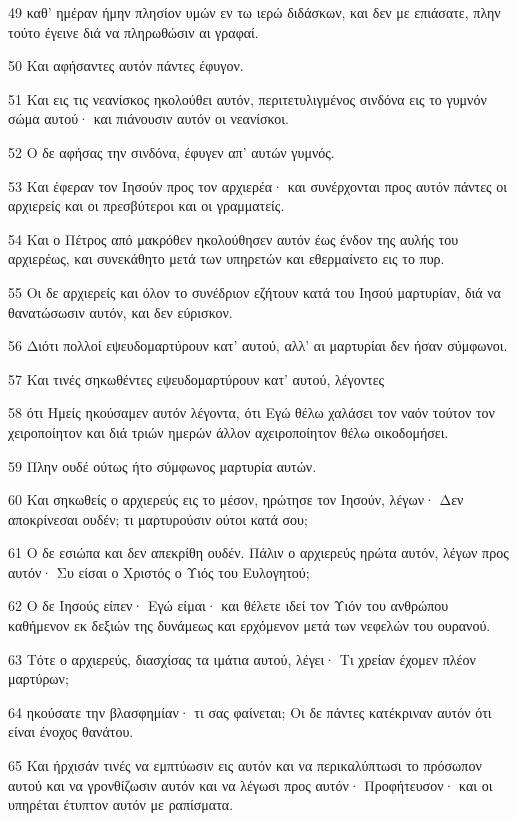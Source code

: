 \par 49 καθ' ημέραν ήμην πλησίον υμών εν τω ιερώ διδάσκων, και δεν με επιάσατε, πλην τούτο έγεινε διά να πληρωθώσιν αι γραφαί.
\par 50 Και αφήσαντες αυτόν πάντες έφυγον.
\par 51 Και εις τις νεανίσκος ηκολούθει αυτόν, περιτετυλιγμένος σινδόνα εις το γυμνόν σώμα αυτού· και πιάνουσιν αυτόν οι νεανίσκοι.
\par 52 Ο δε αφήσας την σινδόνα, έφυγεν απ' αυτών γυμνός.
\par 53 Και έφεραν τον Ιησούν προς τον αρχιερέα· και συνέρχονται προς αυτόν πάντες οι αρχιερείς και οι πρεσβύτεροι και οι γραμματείς.
\par 54 Και ο Πέτρος από μακρόθεν ηκολούθησεν αυτόν έως ένδον της αυλής του αρχιερέως, και συνεκάθητο μετά των υπηρετών και εθερμαίνετο εις το πυρ.
\par 55 Οι δε αρχιερείς και όλον το συνέδριον εζήτουν κατά του Ιησού μαρτυρίαν, διά να θανατώσωσιν αυτόν, και δεν εύρισκον.
\par 56 Διότι πολλοί εψευδομαρτύρουν κατ' αυτού, αλλ' αι μαρτυρίαι δεν ήσαν σύμφωνοι.
\par 57 Και τινές σηκωθέντες εψευδομαρτύρουν κατ' αυτού, λέγοντες
\par 58 ότι Ημείς ηκούσαμεν αυτόν λέγοντα, ότι Εγώ θέλω χαλάσει τον ναόν τούτον τον χειροποίητον και διά τριών ημερών άλλον αχειροποίητον θέλω οικοδομήσει.
\par 59 Πλην ουδέ ούτως ήτο σύμφωνος μαρτυρία αυτών.
\par 60 Και σηκωθείς ο αρχιερεύς εις το μέσον, ηρώτησε τον Ιησούν, λέγων· Δεν αποκρίνεσαι ουδέν; τι μαρτυρούσιν ούτοι κατά σου;
\par 61 Ο δε εσιώπα και δεν απεκρίθη ουδέν. Πάλιν ο αρχιερεύς ηρώτα αυτόν, λέγων προς αυτόν· Συ είσαι ο Χριστός ο Υιός του Ευλογητού;
\par 62 Ο δε Ιησούς είπεν· Εγώ είμαι· και θέλετε ιδεί τον Υιόν του ανθρώπου καθήμενον εκ δεξιών της δυνάμεως και ερχόμενον μετά των νεφελών του ουρανού.
\par 63 Τότε ο αρχιερεύς, διασχίσας τα ιμάτια αυτού, λέγει· Τι χρείαν έχομεν πλέον μαρτύρων;
\par 64 ηκούσατε την βλασφημίαν· τι σας φαίνεται; Οι δε πάντες κατέκριναν αυτόν ότι είναι ένοχος θανάτου.
\par 65 Και ήρχισάν τινές να εμπτύωσιν εις αυτόν και να περικαλύπτωσι το πρόσωπον αυτού και να γρονθίζωσιν αυτόν και να λέγωσι προς αυτόν· Προφήτευσον· και οι υπηρέται έτυπτον αυτόν με ραπίσματα.
